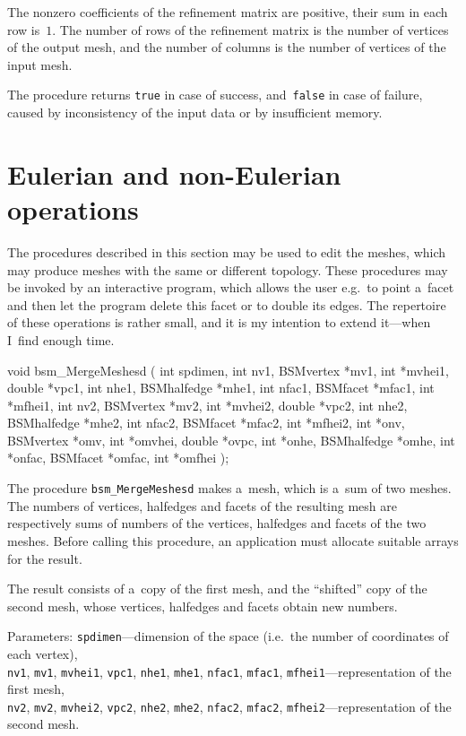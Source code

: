 The nonzero coefficients of the refinement matrix are positive, their sum in
each row is~$1$. The number of rows of the refinement matrix is the number
of vertices of the output mesh, and the number of columns is the number of
vertices of the input mesh.

The procedure returns \texttt{true} in case of success, and~\texttt{false}
in case of failure, caused by inconsistency of the input data or by
insufficient memory.

\newpage
\section{Eulerian and non-Eulerian operations}

The procedures described in this section may be used to edit the meshes,
which may produce meshes with the same or different topology. These
procedures may be invoked by an interactive program, which allows the user
e.g.\ to point a~facet and then let the program delete this facet or to
double its edges. The repertoire of these operations is rather small, and it
is my intention to extend it---when I~find enough time.

\medskip
\begin{listingC}
void bsm_MergeMeshesd ( int spdimen,
                  int nv1, BSMvertex *mv1, int *mvhei1, double *vpc1,
                  int nhe1, BSMhalfedge *mhe1,
                  int nfac1, BSMfacet *mfac1, int *mfhei1,
                  int nv2, BSMvertex *mv2, int *mvhei2, double *vpc2,
                  int nhe2, BSMhalfedge *mhe2,
                  int nfac2, BSMfacet *mfac2, int *mfhei2,
                  int *onv, BSMvertex *omv, int *omvhei, double *ovpc,
                  int *onhe, BSMhalfedge *omhe,
                  int *onfac, BSMfacet *omfac, int *omfhei );
\end{listingC}
The procedure \texttt{bsm\_MergeMeshesd} makes a~mesh, which is a~sum of two
meshes. The numbers of vertices, halfedges and facets of the resulting mesh
are respectively sums of numbers of the vertices, halfedges and facets of
the two meshes. Before calling this procedure, an application must allocate
suitable arrays for the result.

The result consists of a~copy of the first mesh, and the ``shifted'' copy of
the second mesh, whose vertices, halfedges and facets obtain new numbers.

Parameters: \texttt{spdimen}---dimension of the space (i.e.\ the number of
coordinates of each vertex), \\
\texttt{nv1}, \texttt{mv1}, \texttt{mvhei1},
\texttt{vpc1}, \texttt{nhe1}, \texttt{mhe1}, \texttt{nfac1}, \texttt{mfac1},
\texttt{mfhei1}---representation of the first mesh, \\
\texttt{nv2}, \texttt{mv2}, \texttt{mvhei2},
\texttt{vpc2}, \texttt{nhe2}, \texttt{mhe2}, \texttt{nfac2}, \texttt{mfac2},
\texttt{mfhei2}---representation of the second mesh.

